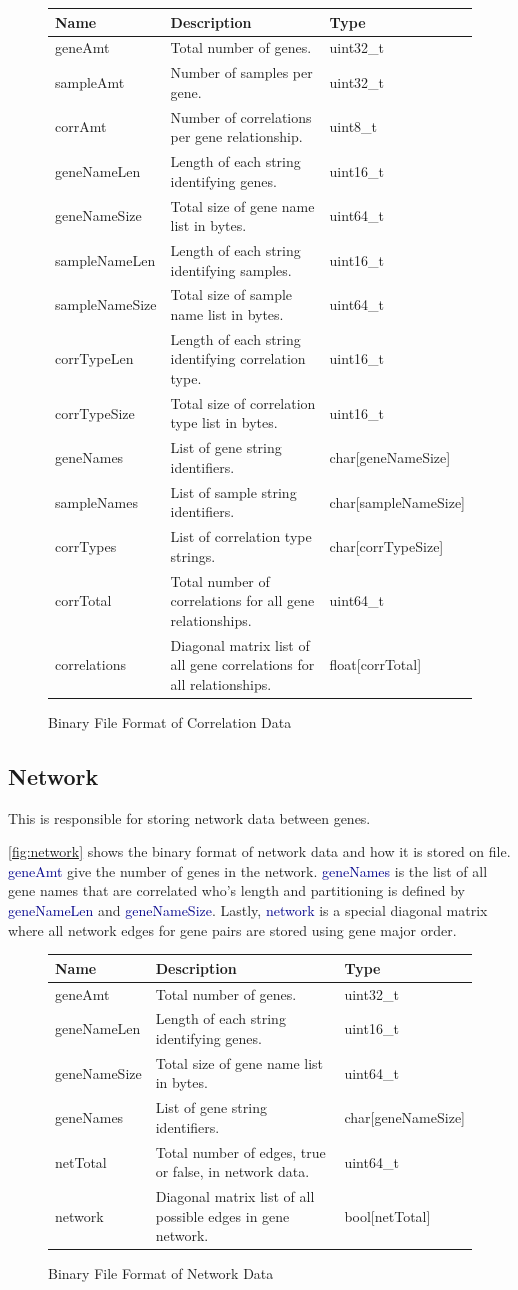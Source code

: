 \documentclass[10pt]{article}
\providecommand{\btable}[3]
{
\begin{figure}[H]
\begin{mdframed}[hidealllines=true,backgroundcolor=btablecol]
\begin{tabularx}{\textwidth}{|l|X|l|}
\hline
\textbf{Name} & \textbf{Description} & \textbf{Type} \\
\hline
#3
\hline
\end{tabularx}
\end{mdframed}
\caption{#1}
\label{#2}
\end{figure}
}
\providecommand{\h}[1]{\textcolor{darkblue}{#1}}
\begin{document}
\btable{Binary File Format of Correlation Data}{fig:correlation}{
geneAmt & Total number of genes. & uint32\_t \\
\hline
sampleAmt & Number of samples per gene. & uint32\_t \\
\hline
corrAmt & Number of correlations per gene relationship. & uint8\_t \\
\hline
geneNameLen & Length of each string identifying genes. & uint16\_t \\
\hline
geneNameSize & Total size of gene name list in bytes. & uint64\_t \\
\hline
sampleNameLen & Length of each string identifying samples. & uint16\_t \\
\hline
sampleNameSize & Total size of sample name list in bytes. & uint64\_t \\
\hline
corrTypeLen & Length of each string identifying correlation type. & uint16\_t \\
\hline
corrTypeSize & Total size of correlation type list in bytes. & uint16\_t \\
\hline
geneNames & List of gene string identifiers. & char[geneNameSize] \\
\hline
sampleNames & List of sample string identifiers. & char[sampleNameSize] \\
\hline
corrTypes & List of correlation type strings. & char[corrTypeSize] \\
\hline
corrTotal & Total number of correlations for all gene relationships. & 
uint64\_t \\
\hline
correlations & Diagonal matrix list of all gene correlations for all 
relationships. & float[corrTotal] \\
}

\subsection{Network}

This is responsible for storing network data between genes.

\autoref{fig:network} shows the binary format of network data and how it is 
stored on file. \h{geneAmt} give the number of genes in the network. 
\h{geneNames} is the list of all gene names that are correlated who's length and 
partitioning is defined by \h{geneNameLen} and \h{geneNameSize}. Lastly, 
\h{network} is a special diagonal matrix where all network edges for gene pairs 
are stored using gene major order.

\btable{Binary File Format of Network Data}{fig:network}{
geneAmt & Total number of genes. & uint32\_t \\
\hline
geneNameLen & Length of each string identifying genes. & uint16\_t \\
\hline
geneNameSize & Total size of gene name list in bytes. & uint64\_t \\
\hline
geneNames & List of gene string identifiers. & char[geneNameSize] \\
\hline
netTotal & Total number of edges, true or false, in network data. & uint64\_t \\
\hline
network & Diagonal matrix list of all possible edges in gene network. & 
bool[netTotal] \\
}
\end{document}
